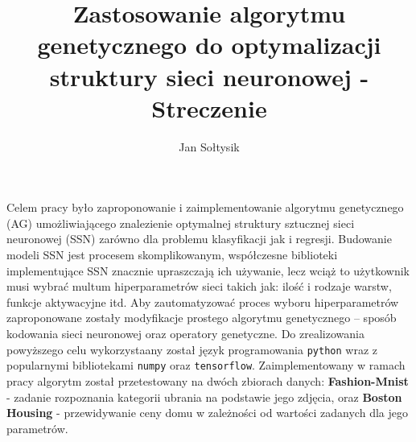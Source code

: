 \documentclass{article}
\title{Zastosowanie algorytmu genetycznego do optymalizacji struktury sieci neuronowej - Streczenie}
\author{Jan Sołtysik}
\begin{document}
\maketitle
Celem pracy było zaproponowanie i zaimplementowanie algorytmu genetycznego (AG) umożliwiającego znalezienie optymalnej struktury sztucznej sieci neuronowej (SSN) zarówno dla problemu klasyfikacji jak i regresji. Budowanie modeli SSN jest procesem skomplikowanym, współczesne biblioteki implementujące SSN znacznie upraszczają ich używanie, lecz wciąż to użytkownik musi wybrać multum hiperparametrów sieci takich jak: ilość i rodzaje warstw, funkcje aktywacyjne itd. Aby zautomatyzować proces wyboru hiperparametrów zaproponowane zostały modyfikacje prostego algorytmu genetycznego – sposób kodowania sieci neuronowej oraz operatory genetyczne. Do zrealizowania powyższego celu wykorzystaany został język programowania \texttt{python} wraz z popularnymi bibliotekami  \texttt{numpy}  oraz  \texttt{tensorflow}.  Zaimplementowany w ramach pracy algorytm został przetestowany na dwóch zbiorach danych: \textbf{Fashion-Mnist} - zadanie rozpoznania kategorii ubrania na podstawie jego zdjęcia, oraz \textbf{Boston Housing} - przewidywanie ceny domu w zależności od wartości zadanych dla jego parametrów.
\end{document}
